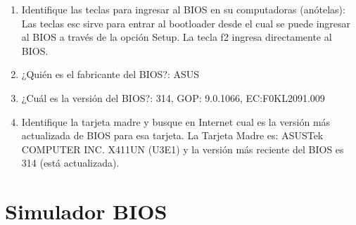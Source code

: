 \documentclass[stu, 12pt, letterpaper, donotrepeattitle, floatsintext, natbib, helv]{apa7}
\begin{document}
\begin{enumerate}
    \item Identifique las teclas para ingresar al BIOS en su computadoras (anótelas): Las teclas esc sirve para entrar al bootloader desde el cual se puede ingresar al BIOS a través de la opción Setup. La tecla f2 ingresa directamente al BIOS.
    \item ¿Quién es el fabricante del BIOS?: ASUS
    \item ¿Cuál es la versión del BIOS?: 314, GOP: 9.0.1066, EC:F0KL2091.009
    \item Identifique la tarjeta madre y busque en Internet cual es la versión más actualizada de BIOS para esa tarjeta. La Tarjeta Madre es: ASUSTek COMPUTER INC. X411UN (U3E1) y la versión más reciente del BIOS es 314 (está actualizada). 
\end{enumerate}

\section*{Simulador BIOS}
{}
\end{document}
